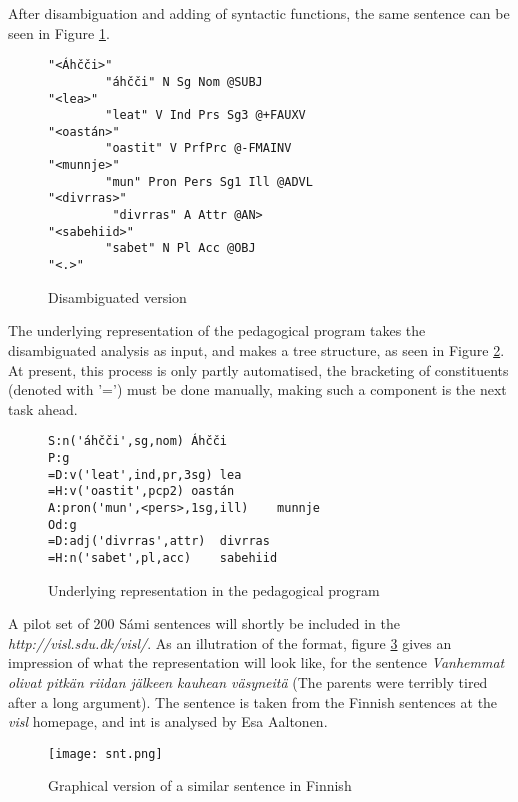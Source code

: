 \documentclass[a4paper,english]{article}
\begin{document}
After disambiguation and adding of syntactic functions, the same sentence can be seen in Figure \ref{fatherdis}.

\begin{figure}[htdp]
\caption{Disambiguated version}
\begin{center}
\begin{verbatim}
"<Áhčči>"
        "áhčči" N Sg Nom @SUBJ
"<lea>"
        "leat" V Ind Prs Sg3 @+FAUXV
"<oastán>"
        "oastit" V PrfPrc @-FMAINV
"<munnje>"
        "mun" Pron Pers Sg1 Ill @ADVL
"<divrras>"
         "divrras" A Attr @AN>
"<sabehiid>"
        "sabet" N Pl Acc @OBJ
"<.>"
\end{verbatim}
\end{center}
\label{fatherdis}
\end{figure}%

The underlying representation of the pedagogical program takes the disambiguated analysis as input, and makes a tree structure, as seen in Figure \ref{underlying}. At present, this process is only partly automatised, the bracketing of constituents (denoted with '=') must be done manually, making such a component is the next task ahead.

\begin{figure}[htdp]
\caption{Underlying representation in the pedagogical program}
\begin{center}
\begin{verbatim}
S:n('áhčči',sg,nom)	Áhčči
P:g
=D:v('leat',ind,pr,3sg)	lea
=H:v('oastit',pcp2)	oastán
A:pron('mun',<pers>,1sg,ill)	munnje
Od:g
=D:adj('divrras',attr)  divrras
=H:n('sabet',pl,acc)	sabehiid
\end{verbatim}
\end{center}
\label{underlying}
\end{figure}%

A pilot set of 200 Sámi sentences will shortly be included in the \textit{http://visl.sdu.dk/visl/}. As an illutration of the format, figure \ref{fin} gives an impression of what the representation will look like, for the sentence \textit{Vanhemmat olivat pitkän riidan jälkeen kauhean väsyneitä} (The parents were terribly tired after a long argument). The sentence is taken from the Finnish sentences at the \textit{visl} homepage, and int is analysed by Esa Aaltonen.


\begin{figure}
\caption{Graphical version of a similar sentence in Finnish}
\begin{center}
\texttt{[image: snt.png]}
\end{center}
\label{fin}
\end{figure}
\end{document}
